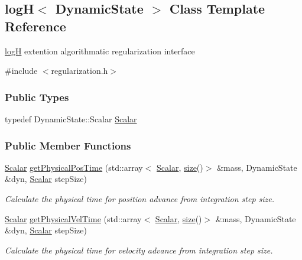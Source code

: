 \hypertarget{classlog_h}{}\subsection{logH$<$ Dynamic\+State $>$ Class Template Reference}
\label{classlog_h}


\mbox{\hyperlink{classlog_h}{logH}} extention algorithmatic regularization interface  




{\ttfamily \#include $<$regularization.\+h$>$}

\subsubsection*{Public Types}
\begin{DoxyCompactItemize}
\item 
typedef Dynamic\+State\+::\+Scalar \mbox{\hyperlink{classlog_h_a3c5a69c2908971aa6cd8ff82845418d0}{Scalar}}
\end{DoxyCompactItemize}
\subsubsection*{Public Member Functions}
\begin{DoxyCompactItemize}
\item 
\mbox{\hyperlink{classlog_h_a3c5a69c2908971aa6cd8ff82845418d0}{Scalar}} \mbox{\hyperlink{classlog_h_a57fa85fad38dae198ec4eadd757d4f40}{get\+Physical\+Pos\+Time}} (std\+::array$<$ \mbox{\hyperlink{classlog_h_a3c5a69c2908971aa6cd8ff82845418d0}{Scalar}}, \mbox{\hyperlink{classlog_h_a94f9577ea2cc32d422ebf078e123480b}{size}}()$>$ \&mass, Dynamic\+State \&dyn, \mbox{\hyperlink{classlog_h_a3c5a69c2908971aa6cd8ff82845418d0}{Scalar}} step\+Size)
\begin{DoxyCompactList}\small\item\em Calculate the physical time for position advance from integration step size. \end{DoxyCompactList}\item 
\mbox{\hyperlink{classlog_h_a3c5a69c2908971aa6cd8ff82845418d0}{Scalar}} \mbox{\hyperlink{classlog_h_a4e287cd21c48b51fa9535c5b692ca3f2}{get\+Physical\+Vel\+Time}} (std\+::array$<$ \mbox{\hyperlink{classlog_h_a3c5a69c2908971aa6cd8ff82845418d0}{Scalar}}, \mbox{\hyperlink{classlog_h_a94f9577ea2cc32d422ebf078e123480b}{size}}()$>$ \&mass, Dynamic\+State \&dyn, \mbox{\hyperlink{classlog_h_a3c5a69c2908971aa6cd8ff82845418d0}{Scalar}} step\+Size)
\begin{DoxyCompactList}\small\item\em Calculate the physical time for velocity advance from integration step size. \end{DoxyCompactList}\end{DoxyCompactItemize}
